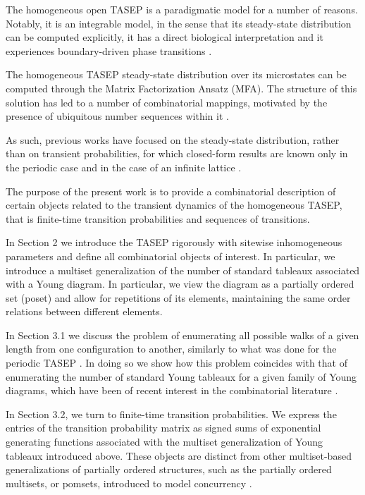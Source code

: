 \documentclass{article}
\begin{document}
The homogeneous open  TASEP is a paradigmatic model for a number of reasons. Notably, it is an integrable model, in the sense that its steady-state distribution can be computed explicitly, it has a direct biological interpretation and it experiences boundary-driven phase transitions \cite{Blythe_2007}. 

The homogeneous TASEP steady-state distribution over its microstates can be computed through the Matrix Factorization Ansatz (MFA). The structure of this solution has led to a number of combinatorial mappings, motivated by the presence of ubiquitous number sequences within it \cite{Wood_2020}.

As such, previous works have focused on the steady-state distribution, rather than on transient probabilities, for which closed-form results are known only in the periodic case and in the case of an infinite lattice \cite{PhysRevLett.91.050601, schutz1997exact}.

The purpose of the present work is to provide a combinatorial description of certain objects related to the transient dynamics of the homogeneous TASEP, that is finite-time transition probabilities and sequences of transitions. 

In Section 2 we introduce the TASEP rigorously with sitewise inhomogeneous parameters and define all combinatorial objects of interest. In particular, we introduce a multiset generalization of the number of standard tableaux associated with a Young diagram. In particular, we view the diagram as a partially ordered set (poset) and allow for repetitions of its elements, maintaining the same order relations between different elements.

In Section 3.1 we discuss the problem of enumerating all possible walks of a given length from one configuration to another, similarly to what was done for the periodic TASEP \cite{elizalde2022walks}. In doing so we show how this problem coincides with that of enumerating the number of standard Young tableaux for a given family of Young diagrams, which have been of recent interest in the combinatorial literature \cite{Sun2015EnumerationOS,VeraLopez2017,EnumTableaux}.

In Section 3.2, we turn to finite-time transition probabilities. We express the entries of the transition probability matrix as signed sums of exponential generating functions associated with the multiset generalization of Young tableaux introduced above. These objects are distinct from other multiset-based generalizations of partially ordered structures, such as the partially ordered multisets, or pomsets, introduced to model concurrency \cite{Pratt1986ModelingCW}.
\end{document}
